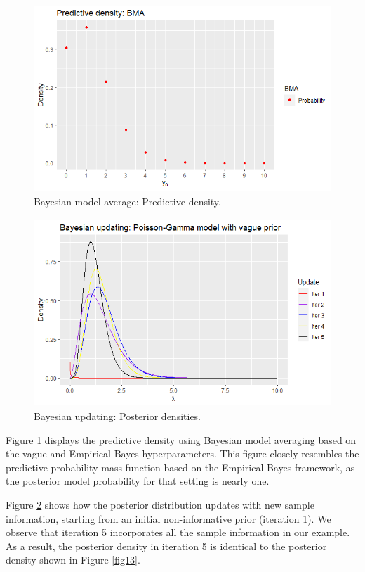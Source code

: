 \begin{figure}[!h]
	\includegraphics[width=340pt, height=200pt]{Chapters/chapter1/figures/BMA.png}
	\caption[List of figure caption goes here]{Bayesian model average: Predictive density.}\label{fig15}
\end{figure}

\begin{figure}[!h]
	\includegraphics[width=340pt, height=200pt]{Chapters/chapter1/figures/Updating.png}
	\caption[List of figure caption goes here]{Bayesian updating: Posterior densities.}\label{fig16}
\end{figure}

Figure \ref{fig15} displays the predictive density using Bayesian model averaging based on the vague and Empirical Bayes hyperparameters. This figure closely resembles the predictive probability mass function based on the Empirical Bayes framework, as the posterior model probability for that setting is nearly one.

Figure \ref{fig16} shows how the posterior distribution updates with new sample information, starting from an initial non-informative prior (iteration 1). We observe that iteration 5 incorporates all the sample information in our example. As a result, the posterior density in iteration 5 is identical to the posterior density shown in Figure \ref{fig13}.

